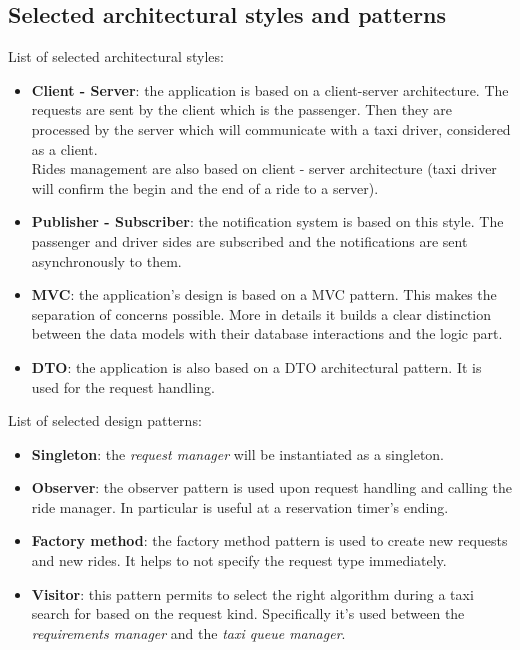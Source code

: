 \subsection{Selected architectural styles and patterns}
List of selected architectural styles:
\begin{itemize}
\item \label{itm:client-server} \textbf{Client - Server}: the application is based on a client-server architecture. The requests are sent by the client which is the passenger. Then they are processed by the server which will communicate with a taxi driver, considered as a client.\\
Rides management are also based on client - server architecture (taxi driver will confirm the begin and the end of a ride to a server).
\item \label{itm:pubsub} \textbf{Publisher - Subscriber}: the notification system is based on this style. The passenger and driver sides are subscribed and the notifications are sent asynchronously to them.
\item \label{itm:mvc} \textbf{MVC}: the application's design is based on a MVC pattern. This makes the separation of concerns possible. More in details it builds a clear distinction between the data models with their database interactions and the logic part.
\item \label{itm:dto} \textbf{DTO}: the application is also based on a DTO architectural pattern. It is used for the request handling.
\end{itemize}
List of selected design patterns:
\begin{itemize}
\item \label{itm:singleton} \textbf{Singleton}: the \textit{request manager} will be instantiated as a singleton.
\item \label{itm:observer} \textbf{Observer}: the observer pattern is used upon request handling and calling the ride manager. In particular is useful at a reservation timer's ending.
\item \label{itm:factory} \textbf{Factory method}: the factory method pattern is used to create new requests and new rides. It helps to not specify the request type immediately.
\item \label{itm:visitor} \textbf{Visitor}: this pattern permits to select the right algorithm during a taxi search for based on the request kind. Specifically it's used between the \textit{requirements manager} and the \textit{taxi queue manager}.

\end{itemize}


